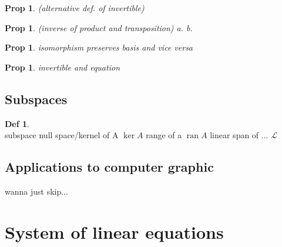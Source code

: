 \documentclass[hidelinks]{article}
\theoremstyle{definition}
\newtheorem*{defin}{Def}
\theoremstyle{plain}
\newtheorem{proposition}[theorem]{Prop}
\theoremstyle{remark}
\DeclareMathOperator{\range}{ran}
\begin{document}
\begin{proposition} (alternative def. of invertible)

\end{proposition}

\begin{proposition}
(inverse of product and transposition)
a. \newline
b. 
\end{proposition}

\begin{proposition}
isomorphism preserves basis and vice versa
\end{proposition}

\begin{proposition}
invertible and equation
\end{proposition}

\subsection{Subspaces}
\begin{defin}~\\
subspace \newline
\indent null space/kernel of A $\ker A$ \newline
\indent range of a $\range A$ \newline
\indent linear span of ... $\mathscr{L}$
\end{defin}

\subsection{Applications to computer graphic}
wanna just skip...



\section{System of linear equations}
\end{document}
